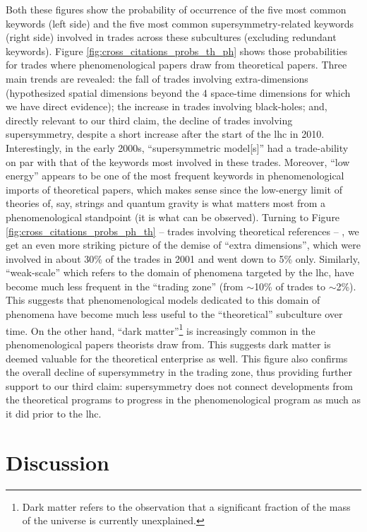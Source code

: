 \documentclass[smallextended]{svjour3}
\begin{document}
Both these figures show the probability of occurrence of the five most common keywords (left side) and the five most common supersymmetry-related keywords (right side) involved in trades across these subcultures (excluding redundant keywords). Figure \ref{fig:cross_citations_probs_th_ph} shows those probabilities for trades where phenomenological papers draw from theoretical papers. Three main trends are revealed: the fall of trades involving extra-dimensions (hypothesized spatial dimensions beyond the 4 space-time dimensions for which we have direct evidence); the increase in trades involving black-holes; and, directly relevant to our third claim, the decline of trades involving supersymmetry, despite a short increase after the start of the \gls{lhc} in 2010. Interestingly, in the early 2000s, ``supersymmetric model[s]'' had a trade-ability on par with that of the keywords most involved in these trades. Moreover, ``low energy'' appears to be one of the most frequent keywords in phenomenological imports of theoretical papers, which makes sense since the low-energy limit of theories of, say, strings and quantum gravity is what matters most from a phenomenological standpoint (it is what can be observed). Turning to Figure \ref{fig:cross_citations_probs_ph_th} -- trades involving theoretical references -- , we get an even more striking picture of the demise of ``extra dimensions'', which were involved in about 30\% of the trades in 2001 and went down to 5\% only. Similarly, ``weak-scale''  which refers to the domain of phenomena targeted by the \gls{lhc}, have become much less frequent in the ``trading zone'' (from $\sim$10\% of trades to $\sim$2\%). This suggests that phenomenological models dedicated to this domain of phenomena have become much less useful to the ``theoretical'' subculture over time. On the other hand, ``dark matter''\footnote{Dark matter refers to the observation that a significant fraction of the mass of the universe is currently unexplained.} is increasingly common in the phenomenological papers theorists draw from. This suggests dark matter is deemed valuable for the theoretical enterprise as well. This figure also confirms the overall decline of supersymmetry in the trading zone, thus providing further support to our third claim:  supersymmetry does not connect developments from the theoretical programs to progress in the phenomenological program as much as it did prior to the \gls{lhc}.

\section{\label{section:discussion}Discussion}
\end{document}
